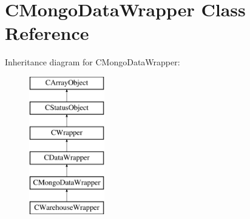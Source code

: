 \hypertarget{class_c_mongo_data_wrapper}{\section{C\-Mongo\-Data\-Wrapper Class Reference}
\label{class_c_mongo_data_wrapper}
}
Inheritance diagram for C\-Mongo\-Data\-Wrapper\-:\begin{figure}[H]
\begin{center}
\leavevmode
\includegraphics[height=6.000000cm]{class_c_mongo_data_wrapper}
\end{center}
\end{figure}
